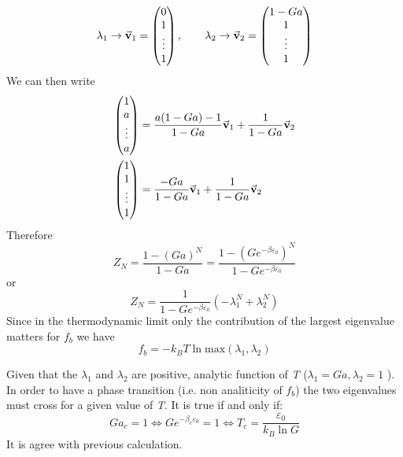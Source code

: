 \documentclass[../main/main.tex]{subfiles}
\begin{document}
\begin{equation}
  \lambda _1 \rightarrow \va{v}_1 = \begin{pmatrix}
  0 \\
  1 \\
  \vdots \\
  1
  \end{pmatrix},
  \qquad
  \lambda _2 \rightarrow \va{v}_2 = \begin{pmatrix}
  1-Ga \\
  1 \\
  \vdots \\
  1
  \end{pmatrix}
\end{equation}
We can then write
\begin{subequations}
\begin{align}
  \begin{pmatrix}
  1 \\
  a \\
  \vdots \\
  a
\end{pmatrix}  &= \frac{a(1-Ga)-1}{1-Ga} \va{v}_1 + \frac{1}{1-Ga}\va{v}_2 \\
\begin{pmatrix}
1 \\
1 \\
\vdots \\
1
\end{pmatrix}  &= \frac{-Ga}{1-Ga} \va{v}_1 + \frac{1}{1-Ga}\va{v}_2
\end{align}
\end{subequations}
Therefore
\begin{equation}
  Z_N = \frac{1-(Ga)^N}{1-Ga} = \frac{1-(G e^{-\beta \varepsilon _0} )^N}{1-G e^{-\beta \varepsilon _0} }
\end{equation}
or
\begin{equation}
  Z_N = \frac{1}{1-G e^{-\beta \varepsilon _0} } (-\lambda _1^N + \lambda _2^N)
\end{equation}
Since in the thermodynamic limit only the contribution of the largest eigenvalue matters for \( f_b \) we have
\begin{equation}
  f_b = - k_B T \ln{\text{max} (\lambda _1, \lambda _2)}
\end{equation}
\begin{remark}
Given that the \( \lambda _1 \) and \( \lambda _2 \) are positive, analytic function of \emph{T} (\( \lambda _1 = Ga, \lambda _2=1 \) ). In order to have a phase transition
(i.e. non analiticity of \( f_b \)) the two eigenvalues must cross for a given value of \emph{T}. It is true if and only if:
\begin{equation}
  G a_c =1 \Leftrightarrow G e^{-\beta _c \varepsilon _0} = 1  \Leftrightarrow T_c = \frac{\varepsilon _0}{k_B \ln{G} }
\end{equation}
It is agree with previous calculation.
\end{remark}
\end{document}

